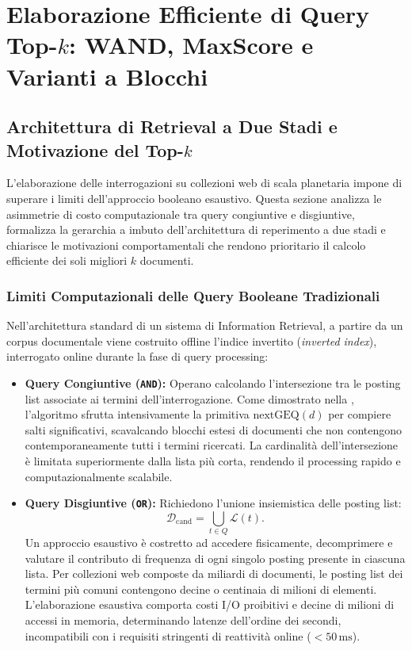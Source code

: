\chapter{Elaborazione Efficiente di Query Top-$k$: WAND, MaxScore e Varianti a Blocchi}
\label{chap:elaborazione-topk-wand-maxscore}

\FloatBarrier
\section{Architettura di Retrieval a Due Stadi e Motivazione del Top-$k$}
\label{sec:architettura-funnel-topk}

L'elaborazione delle interrogazioni su collezioni web di scala planetaria impone di superare i limiti dell'approccio booleano esaustivo. Questa sezione analizza le asimmetrie di costo computazionale tra query congiuntive e disgiuntive, formalizza la gerarchia a imbuto dell'architettura di reperimento a due stadi e chiarisce le motivazioni comportamentali che rendono prioritario il calcolo efficiente dei soli migliori $k$ documenti.

\FloatBarrier
\subsection{Limiti Computazionali delle Query Booleane Tradizionali}
\label{subsec:limiti-computazionali-query-booleane}
Nell'architettura standard di un sistema di Information Retrieval, a partire da un corpus documentale viene costruito offline l'indice invertito (\textit{inverted index}), interrogato online durante la fase di query processing:
\begin{itemize}
    \item \textbf{Query Congiuntive (\texttt{AND}):} Operano calcolando l'intersezione tra le posting list associate ai termini dell'interrogazione. Come dimostrato nella , l'algoritmo sfrutta intensivamente la primitiva $\text{nextGEQ}(d)$ per compiere salti significativi, scavalcando blocchi estesi di documenti che non contengono contemporaneamente tutti i termini ricercati. La cardinalit\`a dell'intersezione \`e limitata superiormente dalla lista pi\`u corta, rendendo il processing rapido e computazionalmente scalabile.
    \item \textbf{Query Disgiuntive (\texttt{OR}):} Richiedono l'unione insiemistica delle posting list:
    \begin{equation}
        \mathcal{D}_{\text{cand}} = \bigcup_{t \in Q} \mathcal{L}(t).
    \end{equation}
    Un approccio esaustivo \`e costretto ad accedere fisicamente, decomprimere e valutare il contributo di frequenza di ogni singolo posting presente in ciascuna lista. Per collezioni web composte da miliardi di documenti, le posting list dei termini pi\`u comuni contengono decine o centinaia di milioni di elementi. L'elaborazione esaustiva comporta costi I/O proibitivi e decine di milioni di accessi in memoria, determinando latenze dell'ordine dei secondi, incompatibili con i requisiti stringenti di reattivit\`a online ($< 50\,\text{ms}$).
\end{itemize}

